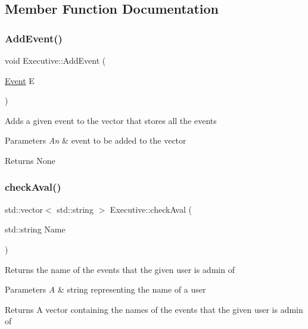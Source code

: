 \subsection{Member Function Documentation}
\mbox{\label{class_executive_aa6ef4869740ffb4ad00da8e03524b757}} 
\subsubsection{\texorpdfstring{Add\+Event()}{AddEvent()}}
{\footnotesize\ttfamily void Executive\+::\+Add\+Event (\begin{DoxyParamCaption}\item[{\mbox{\hyperlink{class_event}{Event}}}]{E }\end{DoxyParamCaption})}

Adds a given event to the vector that stores all the events 
\begin{DoxyParams}{Parameters}
{\em An} & event to be added to the vector \\
\hline
\end{DoxyParams}
\begin{DoxyReturn}{Returns}
None 
\end{DoxyReturn}
\mbox{\label{class_executive_a4099c9d7fba8038ef79df8daddf60f1e}} 
\subsubsection{\texorpdfstring{check\+Aval()}{checkAval()}}
{\footnotesize\ttfamily std\+::vector$<$ std\+::string $>$ Executive\+::check\+Aval (\begin{DoxyParamCaption}\item[{std\+::string}]{Name }\end{DoxyParamCaption})}

Returns the name of the events that the given user is admin of 
\begin{DoxyParams}{Parameters}
{\em A} & string representing the name of a user \\
\hline
\end{DoxyParams}
\begin{DoxyReturn}{Returns}
A vector containing the names of the events that the given user is admin of 
\end{DoxyReturn}
\mbox{\label{class_executive_ada44e998fdc559eba9db2f4edeef0978}} 
